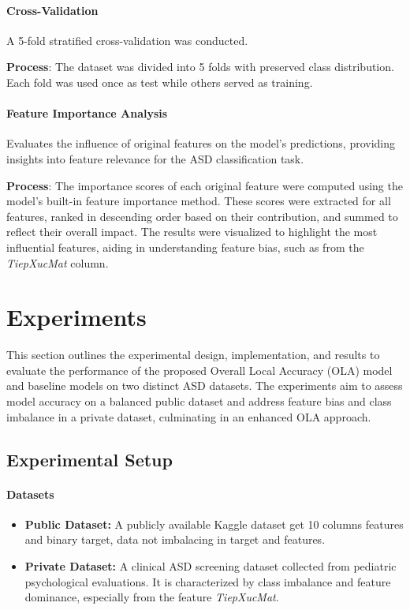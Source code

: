\documentclass[conference]{IEEEtran}
\begin{document}
\paragraph{Cross-Validation}

A 5-fold stratified cross-validation was conducted.  

\textbf{Process}: The dataset was divided into 5 folds with preserved class distribution. Each fold was used once as test while others served as training.  

\paragraph{Feature Importance Analysis}

Evaluates the influence of original features on the model's predictions, providing insights into feature relevance for the ASD classification task.

\textbf{Process}: The importance scores of each original feature were computed using the model's built-in feature importance method. These scores were extracted for all features, ranked in descending order based on their contribution, and summed to reflect their overall impact. The results were visualized to highlight the most influential features, aiding in understanding feature bias, such as from the \textit{TiepXucMat} column.




\section{Experiments}
This section outlines the experimental design, implementation, and results to evaluate the performance of the proposed Overall Local Accuracy (OLA) model and baseline models on two distinct ASD datasets. The experiments aim to assess model accuracy on a balanced public dataset and address feature bias and class imbalance in a private dataset, culminating in an enhanced OLA approach.

\subsection{Experimental Setup}
\paragraph{\textbf{Datasets}}
\begin{itemize}
\item \textbf{Public Dataset:} A publicly available Kaggle dataset get 10 columns features and binary target, data not imbalacing in target and features. 
\item \textbf{Private Dataset:} A clinical ASD screening dataset collected from pediatric psychological evaluations. It is characterized by class imbalance and feature dominance, especially from the feature \textit{TiepXucMat}.
\end{itemize}
\end{document}
